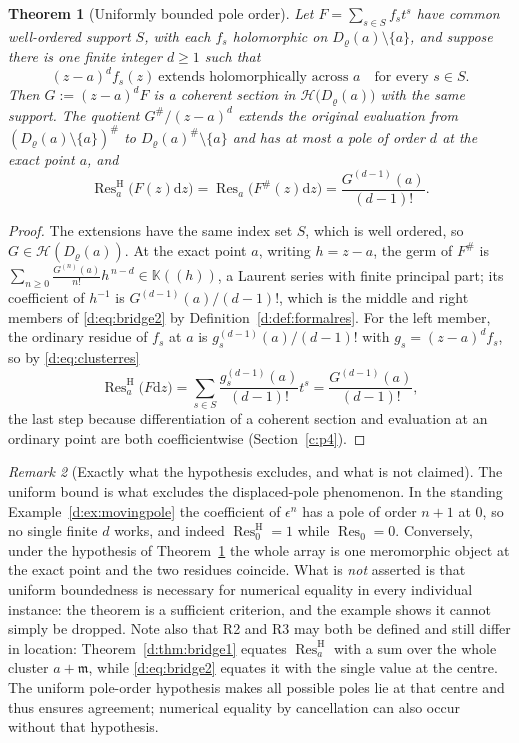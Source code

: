 \documentclass[11pt,a4paper]{article}
\numberwithin{equation}{section}
\newtheorem{theorem}{Theorem}[section]
\theoremstyle{definition}
\theoremstyle{remark}
\newtheorem{remark}[theorem]{Remark}
\theoremstyle{plain}
\newcommand{\K}{\mathbb K}
\newcommand{\mm}{\mathfrak m}
\newcommand{\tm}{t}
\newcommand{\halo}[1]{#1^{\#}}
\newcommand{\ev}[1]{#1^{\#}}
\newcommand{\Hc}{\mathcal H}
\DeclareMathOperator{\Res}{Res}                 %
\newcommand{\ResH}[1]{\Res^{\mathrm H}_{#1}}    %
\newcommand{\Resat}[1]{\Res_{#1}}               %
\newcommand{\dd}{\mathrm d}
\begin{document}
\begin{theorem}[Uniformly bounded pole order]
\label{d:thm:bridge2}
Let $F=\sum_{s\in S}f_s\tm^{s}$ have common well-ordered support $S$,
with each $f_s$ holomorphic on $D_\varrho(a)\setminus\{a\}$, and suppose
there is \emph{one} finite integer $d\ge1$ such that
\[
 (z-a)^{d}f_s(z)\ \text{extends holomorphically across }a
 \quad\text{for every }s\in S .
\]
Then $G:=(z-a)^{d}F$ is a coherent section in $\Hc\bigl(D_\varrho(a)\bigr)$
with the same support. The quotient $\ev G/(z-a)^d$ extends the
original evaluation from $\halo{(D_\varrho(a)\setminus\{a\})}$ to
$\halo{D_\varrho(a)}\setminus\{a\}$ and has at most a pole of
order $d$ at
the \emph{exact} point $a$, and
\begin{equation}\label{d:eq:bridge2}
 \ResH{a}\bigl(F(z)\dd z\bigr)
  =\Resat{a}\bigl(\ev F(z)\dd z\bigr)
  =\frac{G^{(d-1)}(a)}{(d-1)!}.
\end{equation}
\end{theorem}

\begin{proof}
The extensions have the same index set $S$, which is well ordered, so
$G\in\Hc(D_\varrho(a))$.  At the exact point $a$, writing $h=z-a$, the
germ of $\ev F$ is
$\sum_{n\ge0}\frac{G^{(n)}(a)}{n!}h^{\,n-d}\in\K((h))$, a Laurent series
with finite principal part; its coefficient of $h^{-1}$ is
$G^{(d-1)}(a)/(d-1)!$, which is the middle and right members of
\eqref{d:eq:bridge2} by Definition~\ref{d:def:formalres}.  For the left
member, the ordinary residue of $f_s$ at $a$ is
$g_s^{(d-1)}(a)/(d-1)!$ with $g_s=(z-a)^{d}f_s$, so by
\eqref{d:eq:clusterres}
\[
 \ResH{a}\bigl(F\dd z\bigr)
  =\sum_{s\in S}\frac{g_s^{(d-1)}(a)}{(d-1)!}\tm^{s}
  =\frac{G^{(d-1)}(a)}{(d-1)!},
\]
the last step because differentiation of a coherent section and
evaluation at an ordinary point are both coefficientwise (Section~\ref{c:p4}).
\end{proof}

\begin{remark}[Exactly what the hypothesis excludes, and what is not claimed]
\label{d:rem:bridge2scope}
The uniform bound is what excludes the displaced-pole phenomenon.  In
the standing Example~\ref{d:ex:movingpole} the coefficient of
$\epsilon^{n}$ has a pole of order $n+1$ at $0$, so no single finite $d$
works, and indeed $\ResH{0}=1$ while $\Resat{0}=0$.  Conversely, under
the hypothesis of Theorem~\ref{d:thm:bridge2} the whole array is one
meromorphic object at the exact point and the two residues coincide.
What is \emph{not} asserted is that uniform boundedness is necessary for
numerical equality in every individual instance: the theorem is a
sufficient criterion, and the example shows it cannot simply be dropped.
Note also that R2 and R3 may both be defined and still differ in
location: Theorem~\ref{d:thm:bridge1} equates $\ResH{a}$ with a sum over
the whole cluster $a+\mm$, while \eqref{d:eq:bridge2} equates it with the
single value at the centre. The uniform pole-order hypothesis makes
all possible poles lie at that centre and thus ensures agreement;
numerical equality by cancellation can also occur without that hypothesis.
\end{remark}
\end{document}
